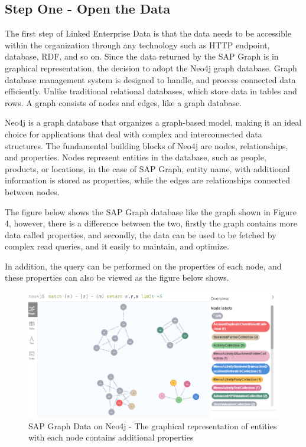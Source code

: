 \documentclass{article}
\begin{document}
\maketitle
\subsection{Step One - Open the Data}

The first step of Linked Enterprise Data is that the data needs to be accessible within the organization through any technology such as HTTP endpoint, database, RDF, and so on. Since the data returned by the SAP Graph is in graphical representation, the decision to adopt the Neo4j graph database. Graph database management system is designed to handle, and process connected data efficiently. Unlike traditional relational databases, which store data in tables and rows. A graph consists of nodes and edges, like a graph database.

Neo4j is a graph database that organizes a graph-based model, making it an ideal choice for applications that deal with complex and interconnected data structures. The fundamental building blocks of Neo4j are nodes, relationships, and properties. Nodes represent entities in the database, such as people, products, or locations, in the case of SAP Graph, entity name, with additional information is stored as properties, while the edges are relationships connected between nodes. \parencite{miller2013}

The figure below shows the SAP Graph database like the graph shown in Figure 4, however, there is a difference between the two, firstly the graph contains more data called properties, and secondly, the data can be used to be fetched by complex read queries, and it easily to maintain, and optimize. 

In addition, the query can be performed on the properties of each node, and these properties can also be viewed as the figure below shows. 


\begin{figure}[ht!]
    \centering
    \includegraphics[scale=0.47]{neo4j-graph}
    \caption{SAP Graph Data on Neo4j - 
The graphical representation of entities with each node contains additional properties}
    \label{fig:neo4j-graph}
\end{figure}
\end{document}
